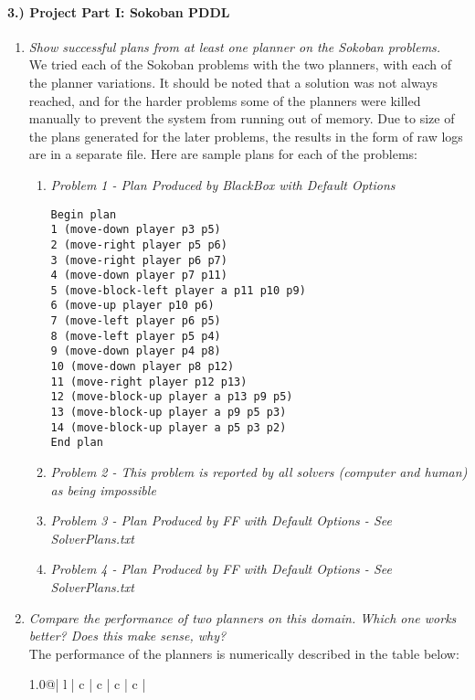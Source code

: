 \documentclass{article}
\begin{document}
\paragraph{3.) Project Part I: Sokoban PDDL}
\begin{enumerate}
\item{\textit{Show successful plans from at least one planner on the Sokoban problems.\\}}
We tried each of the Sokoban problems with the two planners, with each of the planner variations.  It should be noted that a solution was not always reached, and for the harder problems some of the planners were killed manually to prevent the system from running out of memory.  Due to size of the plans generated for the later problems, the results in the form of raw logs are in a separate file.  Here are sample plans for each of the problems:
\begin{enumerate}
\item{\emph{Problem 1 - Plan Produced by BlackBox with Default Options}
\begin{verbatim}
Begin plan
1 (move-down player p3 p5)
2 (move-right player p5 p6)
3 (move-right player p6 p7)
4 (move-down player p7 p11)
5 (move-block-left player a p11 p10 p9)
6 (move-up player p10 p6)
7 (move-left player p6 p5)
8 (move-left player p5 p4)
9 (move-down player p4 p8)
10 (move-down player p8 p12)
11 (move-right player p12 p13)
12 (move-block-up player a p13 p9 p5)
13 (move-block-up player a p9 p5 p3)
14 (move-block-up player a p5 p3 p2)
End plan
\end{verbatim}
}
\item{\emph{Problem 2 - This problem is reported by all solvers (computer and human) as being impossible}}
\item{\emph{Problem 3 - Plan Produced by FF with Default Options - See SolverPlans.txt}}
\item{\emph{Problem 4 - Plan Produced by FF with Default Options - See SolverPlans.txt}}
\end{enumerate}
\item{\textit{Compare the performance of two planners on this domain. Which one works better? Does this make sense, why?\\}
The performance of the planners is numerically described in the table below:
\begin{center}
\begin{table}[h!]
\begin{tabular*}{1.0\textwidth}{@{\extracolsep{\fill}}| l | c | c | c | c |}
\hline
{} \\ \hline

\end{tabular*}
\end{table}
\end{center}}
\end{enumerate}
\end{document}
